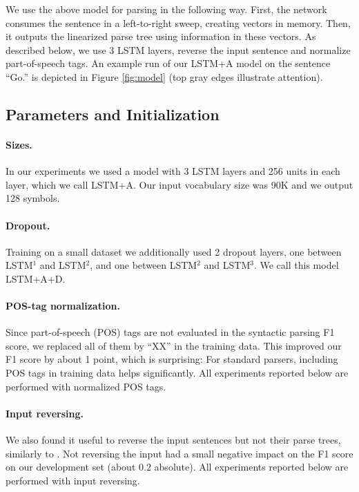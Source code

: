 \documentclass{article} \usepackage{nips15submit_e,times}
\begin{document}
We use the above model for parsing in the following way.
First, the network consumes the sentence in a left-to-right sweep,
creating vectors in memory. Then, it outputs the linearized parse tree
using information in these vectors. As described below, we use 3 LSTM layers,
reverse the input sentence and normalize part-of-speech tags.
An example run of our LSTM+A model on the sentence ``Go.'' is depicted in
Figure \ref{fig:model} (top gray edges illustrate attention).

\subsection{Parameters and Initialization}

\paragraph{Sizes.}
In our experiments we used a model with 3 LSTM layers and 256 units
in each layer, which we call LSTM+A. Our input vocabulary size was 90K
and we output 128 symbols.

\paragraph{Dropout.}
Training on a small dataset we additionally used 2 dropout layers, one
between LSTM$^1$ and LSTM$^2$, and one between LSTM$^2$ and LSTM$^3$.
We call this model LSTM+A+D.

\paragraph{POS-tag normalization.}
Since part-of-speech (POS) tags are not evaluated in the syntactic parsing F1
score, we replaced all of them by ``XX'' in the training data. This improved
our F1 score by about 1 point, which is surprising: For standard parsers,
including POS tags in training data helps significantly. All experiments
reported below are performed with normalized POS tags.

\paragraph{Input reversing.}
We also found it useful to reverse the input sentences but not their parse
trees, similarly to \cite{sutskever14}.
Not reversing the input had a small negative impact on the F1 score on our
development set (about $0.2$ absolute).
All experiments reported below are performed with input reversing.
\end{document}
